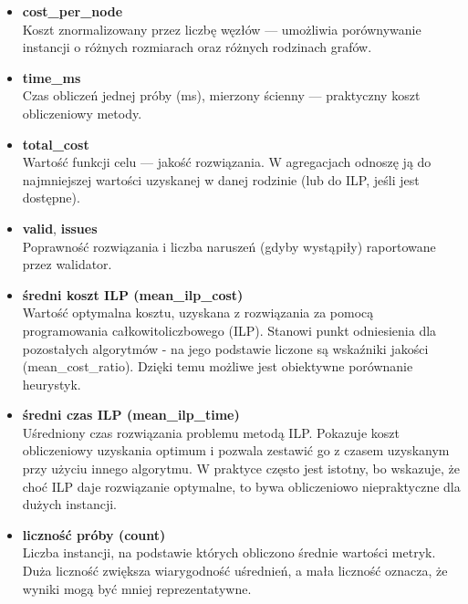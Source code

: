\begin{itemize}
    \item \textbf{cost\_per\_node} \\
    Koszt znormalizowany przez liczbę węzłów — umożliwia porównywanie instancji o różnych rozmiarach oraz różnych rodzinach grafów.

    \item \textbf{time\_ms} \\
    Czas obliczeń jednej próby (ms), mierzony ścienny — praktyczny koszt obliczeniowy metody.

    \item \textbf{total\_cost} \\
    Wartość funkcji celu — jakość rozwiązania. W agregacjach odnoszę ją do najmniejszej wartości uzyskanej w danej rodzinie (lub do ILP, jeśli jest dostępne).

    \item \textbf{valid}, \textbf{issues} \\
    Poprawność rozwiązania i liczba naruszeń (gdyby wystąpiły) raportowane przez walidator.

    \item \textbf{średni koszt ILP (mean\_ilp\_cost)} \\
    Wartość optymalna kosztu, uzyskana z rozwiązania za pomocą programowania całkowitoliczbowego (ILP).
    Stanowi punkt odniesienia dla pozostałych algorytmów - na jego podstawie liczone są wskaźniki jakości (mean\_cost\_ratio).
    Dzięki temu możliwe jest obiektywne porównanie heurystyk.

    \item \textbf{średni czas ILP (mean\_ilp\_time)} \\
    Uśredniony czas rozwiązania problemu metodą ILP.
    Pokazuje koszt obliczeniowy uzyskania optimum i pozwala zestawić go z czasem uzyskanym przy użyciu innego algorytmu.
    W praktyce często jest istotny, bo wskazuje, że choć ILP daje rozwiązanie optymalne,
    to bywa obliczeniowo niepraktyczne dla dużych instancji.

    \item \textbf{liczność próby (count)} \\
    Liczba instancji, na podstawie których obliczono średnie wartości metryk.
    Duża liczność zwiększa wiarygodność uśrednień, a mała liczność oznacza,
    że wyniki mogą być mniej reprezentatywne.
\end{itemize}

